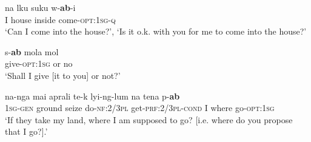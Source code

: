 \documentclass[output=paper]{langsci/langscibook}
\begin{document}
\begin{exe}
	\ex \label{ex:rumsey:ar10}
	\gll na 	lku 	suku w-\textbf{ab}-i\\
	I house	inside come-\textsc{opt}:1\textsc{sg}-\textsc{q}\\
	\trans ‘Can I come into the house?’, ‘Is it o.k. with you for me to come into the house?’
\end{exe} 

\begin{exe}
	\ex \label{ex:rumsey:ar11}
	\gll s-\textbf{ab} mola mol\\
	give-\textsc{opt}:1\textsc{sg} or no\\
	\trans ‘Shall I give [it to you] or not?’
\end{exe}

\begin{exe}
	\ex \label{ex:rumsey:ar12}
	\gll na-nga mai aprali te-k lyi-ng-lum na tena p-\textbf{ab}\\
	1\textsc{sg}-\textsc{gen} ground seize do-\textsc{nf}:2/3\textsc{pl} get-\textsc{prf}:2/3\textsc{pl}-\textsc{cond} I where go-\textsc{opt}:1\textsc{sg}\\
	\trans ‘If they take my land, where I am supposed to go? [i.e. where do you propose that I go?].’
\end{exe}
\end{document}
